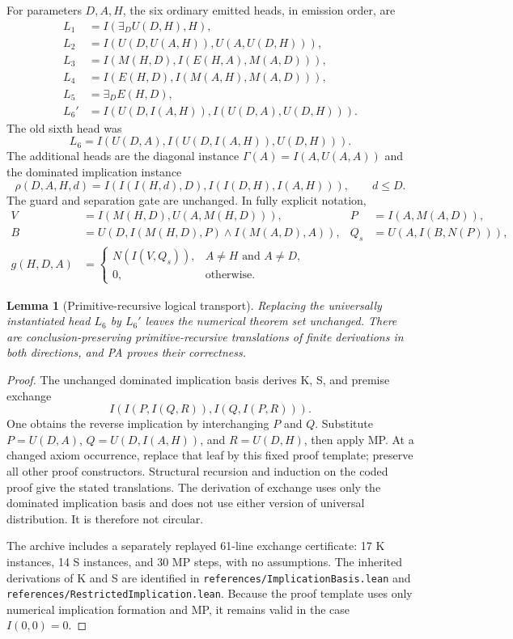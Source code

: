 \documentclass[11pt,letterpaper]{article}
\newtheorem{lemma}[theorem]{Lemma}
\newcommand{\file}[1]{\nolinkurl{#1}}
\begin{document}
For parameters $D,A,H$, the six ordinary emitted heads, in emission order,
are
\begin{align*}
L_1&=I(\exists_D U(D,H),H),\\
L_2&=I(U(D,U(A,H)),U(A,U(D,H))),\\
L_3&=I(M(H,D),I(E(H,A),M(A,D))),\\
L_4&=I(E(H,D),I(M(A,H),M(A,D))),\\
L_5&=\exists_D E(H,D),\\
L_6'&=I(U(D,I(A,H)),I(U(D,A),U(D,H))).
\end{align*}
The old sixth head was
\[
L_6=I(U(D,A),I(U(D,I(A,H)),U(D,H))).
\]
The additional heads are the diagonal instance
$\Gamma(A)=I(A,U(A,A))$ and the dominated implication instance
\[
\rho(D,A,H,d)=I(I(I(H,d),D),I(I(D,H),I(A,H))),\qquad d\le D.
\]
The guard and separation gate are unchanged. In fully explicit notation,
\begin{align*}
V&=I(M(H,D),U(A,M(H,D))),& P&=I(A,M(A,D)),\\
B&=U(D,I(M(H,D),P)\wedge I(M(A,D),A)),&
Q_s&=U(A,I(B,N(P))),\\
g(H,D,A)&=\begin{cases}N(I(V,Q_s)),&A\ne H\text{ and }A\ne D,\\0,&\text{otherwise.}\end{cases}
\end{align*}

\begin{lemma}[Primitive-recursive logical transport]
Replacing the universally instantiated head $L_6$ by $L_6'$ leaves the
numerical theorem set unchanged. There are conclusion-preserving
primitive-recursive translations of finite derivations in both directions,
and PA proves their correctness.
\end{lemma}
\begin{proof}
The unchanged dominated implication basis derives K, S, and premise exchange
\[
I(I(P,I(Q,R)),I(Q,I(P,R))).
\]
One obtains the reverse implication by interchanging $P$ and $Q$.
Substitute $P=U(D,A)$, $Q=U(D,I(A,H))$, and $R=U(D,H)$, then apply MP.
At a changed axiom occurrence, replace that leaf by this fixed proof template;
preserve all other proof constructors. Structural recursion and induction
on the coded proof give the stated translations. The derivation of exchange
uses only the dominated implication basis and does not use either version
of universal distribution. It is therefore not circular.

The archive includes a separately replayed 61-line exchange certificate:
17 K instances, 14 S instances, and 30 MP steps, with no assumptions.
The inherited derivations of K and S are identified in
\file{references/ImplicationBasis.lean} and
\file{references/RestrictedImplication.lean}. Because the proof template
uses only numerical implication formation and MP, it remains valid in
the case $I(0,0)=0$.
\end{proof}
\end{document}
